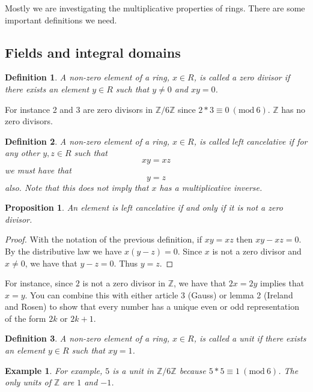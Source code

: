 \documentclass{article}
\theoremstyle{problemstyle}
\newtheorem{example}{Example}
\newtheorem{proposition}{Proposition}
\newtheorem{definition}{Definition}
\newcommand{\Mod}[1]{\ (\mathrm{mod}\ #1)}
\begin{document}
Mostly we are investigating the multiplicative properties of rings. There are some important definitions we need. 

\subsection*{Fields and integral domains}

\begin{definition}
A non-zero element of a ring, $x \in R$, is called a zero divisor if there exists an element $y \in R$ such that $y \neq 0$ and $xy = 0$. 
\end{definition}

For instance 2 and 3 are zero divisors in $\mathbb{Z}/6\mathbb{Z}$ since $2*3 \equiv 0 \Mod{6}$. $\mathbb{Z}$ has no zero divisors. 

\begin{definition}
A non-zero element of a ring, $x \in R$, is called left cancelative if for any other  $y,z \in R$ such that $$xy = xz$$ we must have that $$y = z$$ also. Note that this does not imply that $x$ has a multiplicative inverse.  
\end{definition}

\begin{proposition}
An element is left cancelative if and only if it is not a zero divisor. 
\end{proposition}

\begin{proof}
With the notation of the previous definition, if $xy = xz$ then $xy-xz=0$. By the distributive law we have $x(y-z) = 0$. Since $x$ is not a zero divisor and $x \neq 0$, we have that $y - z = 0$. Thus $y = z$. 
\end{proof}

For instance, since $2$ is not a zero divisor in $\mathbb{Z}$, we have that $2x = 2y$ implies that $x = y$. You can combine this with either article 3 (Gauss) or lemma 2 (Ireland and Rosen) to show that every number has a unique even or odd representation of the form $2k$ or $2k+1$. 

\begin{definition}
A non-zero element of a ring, $x \in R$, is called a unit if there exists an element $y \in R$ such that $xy = 1$. 
\end{definition}

\begin{example}
For example, $5$ is a unit in $\mathbb{Z}/6\mathbb{Z}$ because $5*5 \equiv 1 \Mod{6}$. The only units of $\mathbb{Z}$ are $1$ and $-1$. 
\end{example}
\end{document}
